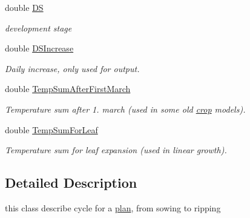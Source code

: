 \begin{DoxyCompactItemize}
double \hyperlink{classphenology_afdc8ea11c9fcb90491341ed8e70d2927}{DS}
\begin{DoxyCompactList}\small\item\em development stage \item\end{DoxyCompactList}\item 
double \hyperlink{classphenology_af7652af43dd671f63d32f95b740a6228}{DSIncrease}
\begin{DoxyCompactList}\small\item\em Daily increase, only used for output. \item\end{DoxyCompactList}\item 
double \hyperlink{classphenology_adc95767d0894610e7f3e90045b4fd254}{TempSumAfterFirstMarch}
\begin{DoxyCompactList}\small\item\em Temperature sum after 1. march (used in some old \hyperlink{classcrop}{crop} models). \item\end{DoxyCompactList}\item 
double \hyperlink{classphenology_ac59e649ce2b4cede632496fbc6de53e1}{TempSumForLeaf}
\begin{DoxyCompactList}\small\item\em Temperature sum for leaf expansion (used in linear growth). \item\end{DoxyCompactList}\end{DoxyCompactItemize}


\subsection{Detailed Description}
this class describe cycle for a \hyperlink{classplan}{plan}, from sowing to ripping 

